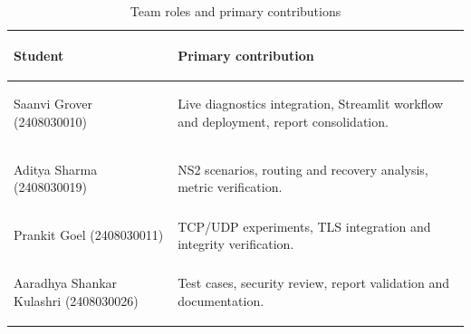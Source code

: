 \documentclass[12pt,a4paper]{report}
\numberwithin{equation}{chapter}
\newcommand{\tighttable}{\renewcommand{\arraystretch}{1.18}}
\begin{document}
\begin{table}[H]
\centering
\caption{Team roles and primary contributions}
\label{tab:team}
\tighttable
\begin{tabularx}{\textwidth}{>{\bfseries\raggedright\arraybackslash}p{}X}
\toprule
Student & Primary contribution\\
\midrule
Saanvi Grover (2408030010) & Live diagnostics integration, Streamlit workflow and deployment, report consolidation.\\
Aditya Sharma (2408030019) & NS2 scenarios, routing and recovery analysis, metric verification.\\
Prankit Goel (2408030011) & TCP/UDP experiments, TLS integration and integrity verification.\\
Aaradhya Shankar Kulashri (2408030026) & Test cases, security review, report validation and documentation.\\
\bottomrule
\end{tabularx}
\end{table}
\end{document}

